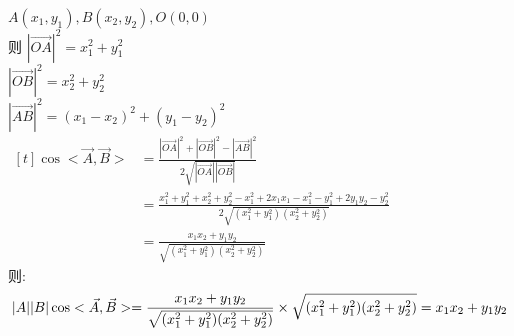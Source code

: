 \documentclass[class=ctexart,crop=false]{standalone}
\begin{document}
    
$A(x_1,y_1),B(x_2,y_2),O(0,0)$\\
则 $|\vec{OA}|^2=x_1^2+y_1^2$\\ 
 $|\vec{OB}|^2=x_2^2+y_2^2$\\ 
 $|\vec{AB}|^2=(x_1-x_2)^2+(y_1-y_2)^2$\\ 
$\begin{aligned}[t]
    \cos<\vec{A},\vec{B}>
    &=\frac{|\vec{OA}|^2+|\vec{OB}|^2-|\vec{AB}|^2}
    {2\sqrt{|\vec{OA}||\vec{OB}|}}\\
    &=\frac{x_1^2+y_1^2+x_2^2+y_2^2-x_1^2+2x_1x_1-x_1^2
    -y_1^2+2y_1y_2-y_2^2}
    {2\sqrt{(x_1^2+y_1^2)(x_2^2+y_2^2)}}\\
    &=\frac{x_1x_2+y_1y_2}{\sqrt{(x_1^2+y_1^2)(x_2^2+y_2^2)}}
\end{aligned}$\\
则:\\
 $$|A||B|\cos<\vec{A},\vec{B}>=\frac{x_1x_2+y_1y_2}{\sqrt{(x_1^2+y_1^2)(x_2^2+y_2^2)}}
\times \sqrt{(x_1^2+y_1^2)(x_2^2+y_2^2)}\\
=x_1x_2+y_1y_2$$
\end{document}

